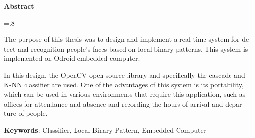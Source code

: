 


\pagestyle{empty}

\begin{latin}

\begin{center}
\textbf{Abstract}
\end{center}
\baselineskip=.8\baselineskip

The purpose of this thesis was to design and implement a real-time system for detect and recognition people's faces based on local binary patterns. This system is implemented on Odroid embedded computer.

In this design, the OpenCV open source library and specifically the cascade and K-NN classifier are used. One of the advantages of this system is its portability, which can be used in various environments that require this application, such as offices for attendance and absence and recording the hours of arrival and departure of people.


\bigskip\noindent\textbf{Keywords}:
Classifier, Local Binary Pattern, Embedded Computer

\end{latin}
